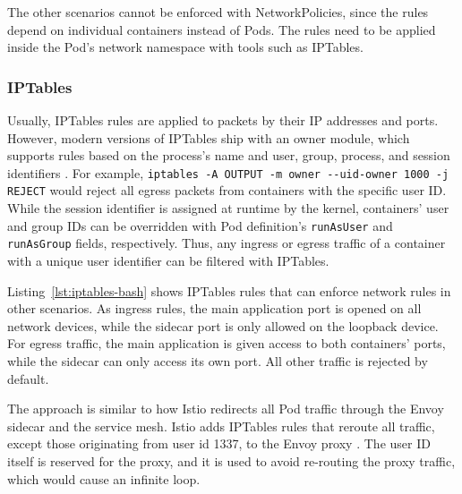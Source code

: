 \documentclass[english, 12pt, a4paper, sci, utf8, a-2b, online]{aaltothesis}
\begin{document}


The other scenarios cannot be enforced with NetworkPolicies, since the rules depend on individual containers instead of Pods.
The rules need to be applied inside the Pod's network namespace with tools such as IPTables.

\subsubsection{IPTables}

Usually, IPTables rules are applied to packets by their IP addresses and ports.
However, modern versions of IPTables ship with an owner module, which supports rules based on the process's name and user, group, process, and session identifiers \cite{iptables-manpage}.
For example, \lstinline{iptables -A OUTPUT -m owner --uid-owner 1000 -j REJECT} would reject all egress packets from containers with the specific user ID.
While the session identifier is assigned at runtime by the kernel, containers' user and group IDs can be overridden with Pod definition's \lstinline{runAsUser} and \lstinline{runAsGroup} fields, respectively.
Thus, any ingress or egress traffic of a container with a unique user identifier can be filtered with IPTables.

Listing~\ref{lst:iptables-bash} shows IPTables rules that can enforce network rules in other scenarios.
As ingress rules, the main application port is opened on all network devices, while the sidecar port is only allowed on the loopback device.
For egress traffic, the main application is given access to both containers' ports, while the sidecar can only access its own port.
All other traffic is rejected by default.



The approach is similar to how Istio redirects all Pod traffic through the Envoy sidecar and the service mesh.
Istio adds IPTables rules that reroute all traffic, except those originating from user id 1337, to the Envoy proxy \cite{istio-iptables}.
The user ID itself is reserved for the proxy, and it is used to avoid re-routing the proxy traffic, which would cause an infinite loop.
\end{document}
